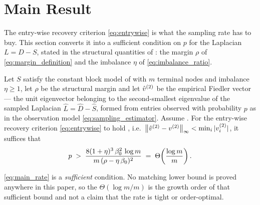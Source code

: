 \section{Main Result}\label{sec:main}
The entry-wise recovery criterion \eqref{eq:entrywise} is what the sampling rate
has to buy. This section converts it into a sufficient condition on $p$ for the
Laplacian $L=D-S$, stated in the structural quantities of : the
margin $\rho$ of \eqref{eq:margin_definition} and the imbalance $\eta$ of
\eqref{eq:imbalance_ratio}.

\begin{theorem}\label{thm:main-sim}
Let $S$ satisfy the constant block model of  with $m$ terminal nodes and
imbalance $\eta\ge1$, let $\rho$
be the structural margin and let $\hat v^{(2)}$ be the empirical Fiedler vector --- the
unit eigenvector belonging to the second-smallest eigenvalue of the sampled
Laplacian $\hat L=\hat D-\hat S$, formed from entries observed with probability
$p$ as in the observation model \eqref{eq:sampling_estimator}. Assume
. For the entry-wise recovery criterion
\eqref{eq:entrywise} to hold \hp, i.e.\
$\left\lVert \hat v^{(2)}-v^{(2)} \right\rVert_\infty<\min_i|v^{(2)}_i|$, it suffices that
\begin{equation}\label{eq:main_rate}
   p\;>\;\frac{8(1+\eta)^3\,\beta_0^2\,\log m}{m\,(\rho-\eta\,\beta_0)^2}
       \;=\;\Theta\!\left(\frac{\log m}{m}\right).
\end{equation}
\end{theorem}

\noindent \eqref{eq:main_rate} is a \emph{sufficient} condition. No matching lower
bound is proved anywhere in this paper, so the $\Theta(\log m/m)$ is the growth
order of that sufficient bound and not a claim that the rate is tight or
order-optimal.


